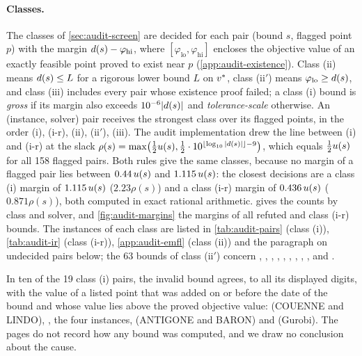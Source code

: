 \paragraph{Classes.}
The classes of \cref{sec:audit-screen} are decided for each pair (bound $s$, flagged point $p$) with the margin $d(s)-\varphi_{\mathrm{hi}}$, where $[\varphi_{\mathrm{lo}},\varphi_{\mathrm{hi}}]$ encloses the objective value of an exactly feasible point proved to exist near $p$ (\cref{app:audit-existence}).
Class (ii) means $d(s)\le L$ for a rigorous lower bound $L$ on $v^{*}$, class (ii$'$) means $\varphi_{\mathrm{lo}}\ge d(s)$, and class (iii) includes every pair whose existence proof failed; a class (i) bound is \emph{gross} if its margin also exceeds $10^{-6}|d(s)|$ and \emph{tolerance-scale} otherwise.
An (instance, solver) pair receives the strongest class over its flagged points, in the order (i), (i-r), (ii), (ii$'$), (iii).
The audit implementation drew the line between (i) and (i-r) at the slack $\rho(s)=\max\bigl(\tfrac12u(s),\tfrac12\cdot10^{\lfloor\log_{10}|d(s)|\rfloor-9}\bigr)$, which equals $\tfrac12u(s)$ for all 158 flagged pairs.
Both rules give the same classes, because no margin of a flagged pair lies between $0.44\,u(s)$ and $1.115\,u(s)$: the closest decisions are a class (i) margin of $1.115\,u(s)$ ($2.23\rho(s)$) and a class (i-r) margin of $0.436\,u(s)$ ($0.871\rho(s)$), both computed in exact rational arithmetic.
 gives the counts by class and solver, and \cref{fig:audit-margins} the margins of all refuted and class (i-r) bounds.
The instances of each class are listed in \cref{tab:audit-pairs} (class (i)), \cref{tab:audit-ir} (class (i-r)), \cref{app:audit-emfl} (class (ii)) and the paragraph on undecided pairs below; the 63 bounds of class (ii$'$) concern , , , , , , , , ,  and .

In ten of the 19 class (i) pairs, the invalid bound agrees, to all its displayed digits, with the value of a listed point that was added on or before the date of the bound and whose value lies above the proved objective value:  (COUENNE and LINDO), , the four  instances,  (ANTIGONE and BARON) and  (Gurobi).
The pages do not record how any bound was computed, and we draw no conclusion about the cause.


